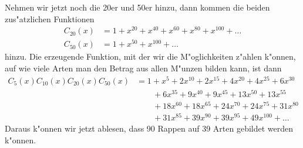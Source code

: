 \begin{beispiele}
Nehmen wir jetzt noch die 20er und 50er hinzu, dann kommen die beiden
zus"atzlichen Funktionen
\begin{align*}
C_{20}(x)&= 1+x^{20}+x^{40}+x^{60}+x^{80}+x^{100}+\dots\\
C_{50}(x)&=1+x^{50}+x^{100}+\dots
\end{align*}
hinzu.
Die erzeugende Funktion, mit der wir die M"oglichkeiten z"ahlen
k"onnen, auf wie viele Arten man den Betrag aus allen M"unzen bilden kann,
ist dann
\begin{align*}
C_5(x) C_{10}(x) C_{20}(x) C_{50}(x)
&=
1+x^5+2 x^{10}+2 x^{15}+4 x^{20}+4 x^{25}+6 x^{30}\\
&\qquad
+6 x^{35} +9 x^{40} +9 x^{45}+13 x^{50}+13 x^{55}\\
&\qquad
+18 x^{60}+18 x^{65} +24 x^{70}+24 x^{75}+31 x^{80}\\
&\qquad
+31 x^{85}+39 x^{90}+39 x^{95} +49 x^{100}+\dots
\end{align*}
Daraus k"onnen wir jetzt ablesen, dass 90 Rappen auf 39 Arten
gebildet werden k"onnen.
\end{beispiele}

